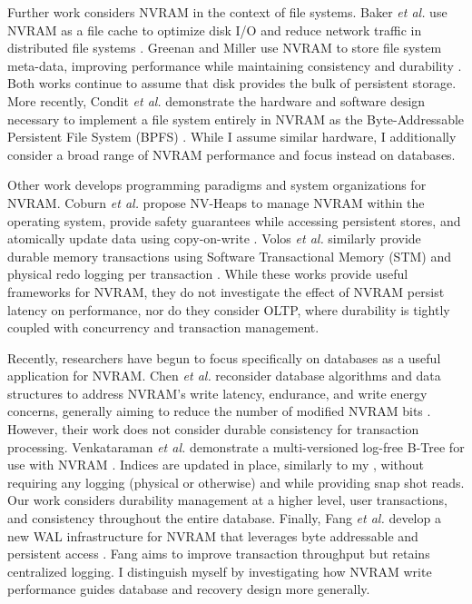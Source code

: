 Further work considers NVRAM in the context of file systems.
Baker \emph{et al.} use NVRAM as a file cache to optimize disk I/O and reduce network traffic in distributed file systems \cite{BakerAsami92}.
Greenan and Miller use NVRAM to store file system meta-data, improving performance while maintaining consistency and durability \cite{GreenanMiller06}.
Both works continue to assume that disk provides the bulk of persistent storage.
More recently, Condit \emph{et al.} demonstrate the hardware and software design necessary to implement a file system entirely in NVRAM as the Byte-Addressable Persistent File System (BPFS) \cite{ConditNightingale09}.
While I assume similar hardware, I additionally consider a broad range of NVRAM performance and focus instead on databases.

Other work develops programming paradigms and system organizations for NVRAM.
Coburn \emph{et al.} propose NV-Heaps to manage NVRAM within the operating system, provide safety guarantees while accessing persistent stores, and atomically update data using copy-on-write \cite{CoburnCaulfield11}.
Volos \emph{et al.} similarly provide durable memory transactions using Software Transactional Memory (STM) and physical redo logging per transaction \cite{VolosTack11}.
While these works provide useful frameworks for NVRAM, they do not investigate the effect of NVRAM persist latency on performance, nor do they consider OLTP, where durability is tightly coupled with concurrency and transaction management.

Recently, researchers have begun to focus specifically on databases as a useful application for NVRAM.
Chen \emph{et al.} reconsider database algorithms and data structures to address NVRAM's write latency, endurance, and write energy concerns, generally aiming to reduce the number of modified NVRAM bits \cite{ChenGibbons11}.
However, their work does not consider durable consistency for transaction processing.
Venkataraman \emph{et al.} demonstrate a multi-versioned log-free B-Tree for use with NVRAM \cite{VenkataramanTolia11}.
Indices are updated in place, similarly to my \InPlace, without requiring any logging (physical or otherwise) and while providing snap shot reads.
Our work considers durability management at a higher level, user transactions, and consistency throughout the entire database.
Finally, Fang \emph{et al.} develop a new WAL infrastructure for NVRAM that leverages byte addressable and persistent access \cite{FangHsiao11}.
Fang aims to improve transaction throughput but retains centralized logging.
I distinguish myself by investigating how NVRAM write performance guides database and recovery design more generally.

